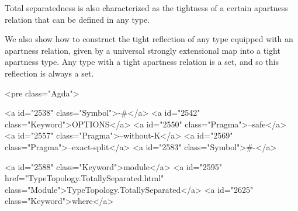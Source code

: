 Total separatedness is also characterized as the tightness of a
certain apartness relation that can be defined in any type.

We also show how to construct the tight reflection of any type
equipped with an apartness relation, given by a universal strongly
extensional map into a tight apartness type. Any type with a tight
apartness relation is a set, and so this reflection is always a set.


<pre class="Agda">

<a id="2538" class="Symbol">{-#</a> <a id="2542" class="Keyword">OPTIONS</a> <a id="2550" class="Pragma">--safe</a> <a id="2557" class="Pragma">--without-K</a> <a id="2569" class="Pragma">--exact-split</a> <a id="2583" class="Symbol">#-}</a>

<a id="2588" class="Keyword">module</a> <a id="2595" href="TypeTopology.TotallySeparated.html" class="Module">TypeTopology.TotallySeparated</a> <a id="2625" class="Keyword">where</a>

